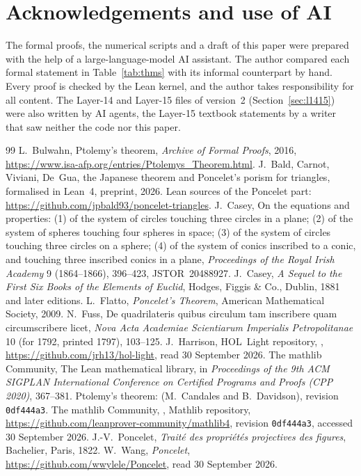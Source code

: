\documentclass[11pt]{article}
\theoremstyle{definition}
\theoremstyle{remark}
\begin{document}
\section*{Acknowledgements and use of AI}
The formal proofs, the numerical scripts and a draft of this paper were prepared with the help of a
large-language-model AI assistant. The author compared each formal statement in
Table~\ref{tab:thms} with its informal counterpart by hand. Every proof is checked by the Lean
kernel, and the author takes responsibility for all content. The Layer-14 and Layer-15 files of
version~2 (Section~\ref{sec:l1415}) were also written by AI agents, the Layer-15 textbook statements
by a writer that saw neither the code nor this paper.

\begin{thebibliography}{99}
 L.~Bulwahn, Ptolemy's theorem, \emph{Archive of Formal Proofs}, 2016,
\url{https://www.isa-afp.org/entries/Ptolemys_Theorem.html}.
 J.~Bald, Carnot, Viviani, De~Gua, the Japanese theorem and Poncelet's porism
for triangles, formalised in Lean~4, preprint, 2026. Lean sources of the Poncelet part:
\url{https://github.com/jpbald93/poncelet-triangles}.
 J.~Casey, On the equations and properties: (1) of the system of circles touching
three circles in a plane; (2) of the system of spheres touching four spheres in space; (3) of the
system of circles touching three circles on a sphere; (4) of the system of conics inscribed to a conic,
and touching three inscribed conics in a plane, \emph{Proceedings of the Royal Irish Academy} 9
(1864--1866), 396--423, JSTOR~20488927.
 J.~Casey, \emph{A Sequel to the First Six Books of the Elements of Euclid},
Hodges, Figgis \& Co., Dublin, 1881 and later editions.
 L.~Flatto, \emph{Poncelet's Theorem}, American Mathematical Society, 2009.
 N.~Fuss, De quadrilateris quibus circulum tam inscribere quam circumscribere licet,
\emph{Nova Acta Academiae Scientiarum Imperialis Petropolitanae} 10 (for 1792, printed 1797),
103--125.
 J.~Harrison, HOL~Light repository, ,
\url{https://github.com/jrh13/hol-light}, read 30 September 2026.
 The mathlib Community, The Lean mathematical library, in \emph{Proceedings of the
9th ACM SIGPLAN International Conference on Certified Programs and Proofs (CPP 2020)}, 367--381.
Ptolemy's theorem:  (M.~Candales and
B.~Davidson), revision \texttt{0df444a3}.
 The mathlib Community, , Mathlib repository,
\url{https://github.com/leanprover-community/mathlib4}, revision \texttt{0df444a3}, accessed
30 September 2026.
 J.-V.~Poncelet, \emph{Trait\'e des propri\'et\'es projectives des figures},
Bachelier, Paris, 1822.
 W.~Wang, \emph{Poncelet}, \url{https://github.com/wwylele/Poncelet}, read
30 September 2026.
\end{thebibliography}
\end{document}
